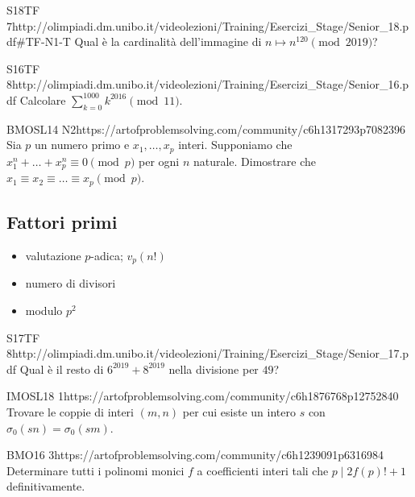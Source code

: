 \documentclass[12pt]{article}
\begin{document}
\begin{esercizio}{S18TF 7}{http://olimpiadi.dm.unibo.it/videolezioni/Training/Esercizi_Stage/Senior_18.pdf\#TF-N1-T}
    Qual è la cardinalità dell'immagine di $n\mapsto n^{120}\pmod{2019}$?
\end{esercizio}

\begin{esercizio}{S16TF 8}{http://olimpiadi.dm.unibo.it/videolezioni/Training/Esercizi_Stage/Senior_16.pdf}
    Calcolare $\sum_{k=0}^{1000} k^{2016}\pmod{11}$.
\end{esercizio}

\begin{esercizio}{BMOSL14 N2}{https://artofproblemsolving.com/community/c6h1317293p7082396}
    Sia $p$ un numero primo e $x_1,\dots,x_p$ interi. Supponiamo che $x_1^n+\dots+x_p^n\equiv0\pmod p$ per ogni $n$ naturale. Dimostrare che $x_1\equiv x_2\equiv\dots\equiv x_p\pmod p$.
\end{esercizio}


\subsection{Fattori primi}

\begin{itemize}
    \item valutazione $p$-adica; $v_p(n!)$
    \item numero di divisori
    \item modulo $p^2$
\end{itemize}

\begin{esercizio}{S17TF 8}{http://olimpiadi.dm.unibo.it/videolezioni/Training/Esercizi_Stage/Senior_17.pdf}
    Qual è il resto di $6^{2019}+8^{2019}$ nella divisione per $49$?
\end{esercizio}

\begin{esercizio}{IMOSL18 1}{https://artofproblemsolving.com/community/c6h1876768p12752840}
    Trovare le coppie di interi $(m,n)$ per cui esiste un intero $s$ con $\sigma_0(sn)=\sigma_0(sm)$.
\end{esercizio}

\begin{esercizio}{BMO16 3}{https://artofproblemsolving.com/community/c6h1239091p6316984}
    Determinare tutti i polinomi monici $f$ a coefficienti interi tali che $p\mid 2f(p)!+1$ definitivamente.
\end{esercizio}
\end{document}
